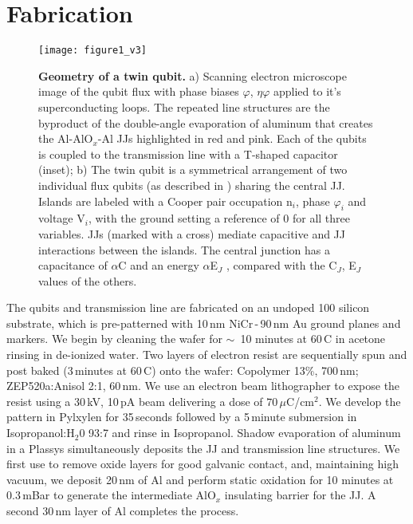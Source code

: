 \section{Fabrication}


\begin{figure}[h]
  \texttt{[image: figure1\_v3]}
  \caption{\small  \textbf{Geometry of  a twin  qubit.}  a)
    Scanning electron  microscope image  of the  qubit flux
    with  phase biases  $  \varphi  $, $  \eta\varphi  $  applied to  it's
    superconducting loops. The repeated line structures are
    the  byproduct  of   the  double-angle  evaporation  of
    aluminum that creates the Al-AlO$_x$-Al JJs highlighted
    in red and pink.  Each of  the qubits is coupled to the
    transmission line with a T-shaped capacitor (inset); b)
    The  twin qubit  is  a symmetrical  arrangement of  two
    individual    flux    qubits     (as    described    in
    \cite{orlando1999})  sharing the  central JJ.   Islands
    are labeled with a  Cooper pair occupation n$_i$, phase
    $\varphi_i$  and voltage  V$_i$,  with the  ground setting  a
    reference of  0 for  all three variables.   JJs (marked
    with a  cross) mediate  capacitive and  JJ interactions
    between  the  islands.   The  central  junction  has  a
    capacitance  of  $\alpha$C  and  an  energy  $  \alpha$E$_{J}$  ,
    compared with the C$_J$, E$_J$ values of the others.}
  \label{fig:setup}
\end{figure}

\noindent The  qubits and transmission line  are fabricated
on an undoped 100 silicon substrate, which is pre-patterned
with   10\,nm   NiCr\,-\,90\,nm   Au  ground   planes   and
markers. We begin by cleaning  the wafer for $\sim$~10 minutes
at 60\,C in acetone rinsing in de-ionized water. Two layers
of  electron resist  are sequentially  spun and  post baked
(3\,minutes  at 60\,C)  onto the  wafer: {Copolymer  13\%},
700\,nm; ZEP520a:Anisol  2:1, 60\,nm.   We use  an electron
beam  lithographer to  expose  the resist  using a  30\,kV,
10\,pA  beam delivering  a dose  of $  70\,\mu $C/cm$^2$.  We
develop the pattern in Pylxylen for 35\,seconds followed by
a 5\,minute submersion in Isopropanol:H$_2$0 93:7 and rinse
in Isopropanol. Shadow evaporation of aluminum in a Plassys
\cite{wu2013}   simultaneously   deposits    the   JJ   and
transmission  line  structures.  We  first  use    to  remove  oxide   layers  for  good  galvanic
contact, and, maintaining high vacuum, we deposit 20\,nm of
Al and perform static oxidation for 10 minutes at 0.3\,mBar
to generate the intermediate AlO$_x$ insulating barrier for
the JJ.  A second 30\,nm layer of Al completes the process.

